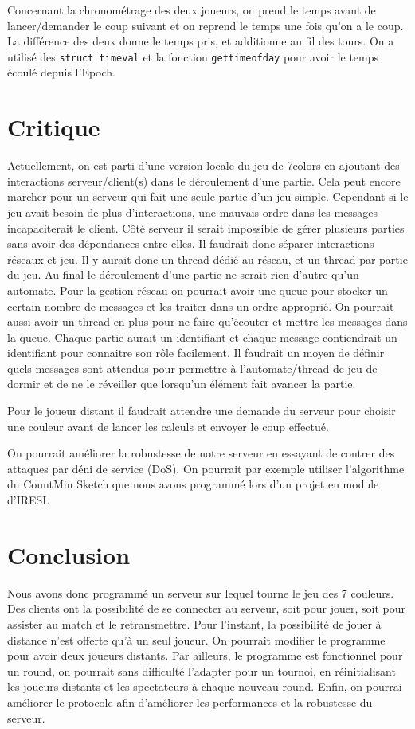 \documentclass[a4paper]{article}
\begin{document}
Concernant la chronométrage des deux joueurs, on prend le temps avant de 
lancer/demander le coup suivant et on reprend le temps une fois qu'on a le 
coup. La différence des deux donne le temps pris, et additionne au fil des 
tours. On a utilisé des \texttt{struct timeval} et la fonction 
\texttt{gettimeofday} pour avoir le temps écoulé depuis l'Epoch.



\section{Critique}

Actuellement, on est parti d'une version locale du jeu de 7colors en ajoutant
des interactions serveur/client(s) dans le déroulement d'une partie. Cela peut
encore marcher pour un serveur qui fait une seule partie d'un jeu simple.
Cependant si le jeu avait besoin de plus d'interactions, une mauvais ordre dans
les messages incapaciterait le client. Côté serveur il serait impossible de
gérer plusieurs parties sans avoir des dépendances entre elles. Il faudrait donc
séparer interactions réseaux et jeu. Il y aurait donc un thread dédié au réseau,
et un thread par partie du jeu. Au final le déroulement d'une partie ne serait
rien d'autre qu'un automate. Pour la gestion réseau on pourrait avoir une queue
pour stocker un certain nombre de messages et les traiter dans un ordre
approprié. On pourrait aussi avoir un thread en plus pour ne faire qu'écouter et
mettre les messages dans la queue. Chaque partie aurait un identifiant et chaque
message contiendrait un identifiant pour connaitre son rôle facilement. Il
faudrait un moyen de définir quels messages sont attendus pour permettre à
l'automate/thread de jeu de dormir et de ne le réveiller que lorsqu'un élément
fait avancer la partie.


Pour le joueur distant il faudrait attendre une demande du serveur pour choisir 
une couleur avant de lancer les calculs et envoyer le coup effectué.

On pourrait améliorer la robustesse de notre serveur en essayant de contrer des 
attaques par déni de service (DoS). On pourrait par exemple utiliser 
l'algorithme du CountMin Sketch que nous avons programmé lors d'un projet en 
module d'IRESI.


\section*{Conclusion}

Nous avons donc programmé un serveur sur lequel tourne le jeu des 7 couleurs. 
Des clients ont la possibilité de se connecter au serveur, soit pour jouer, 
soit pour assister au match et le retransmettre. Pour l'instant, la possibilité 
de jouer à distance n'est offerte qu'à un seul joueur. On pourrait modifier le 
programme pour avoir deux joueurs distants. Par ailleurs, le programme est 
fonctionnel pour un round, on pourrait sans difficulté l'adapter pour un 
tournoi, en réinitialisant les joueurs distants et les spectateurs à chaque 
nouveau round. Enfin, on pourrai améliorer le protocole afin d'améliorer les 
performances et la robustesse du serveur.


 

\end{document}
